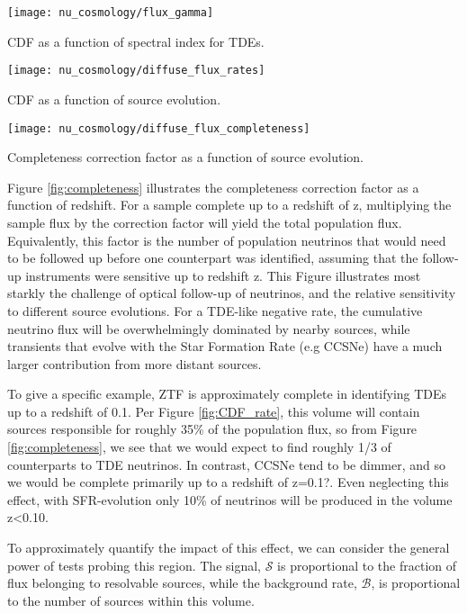 \begin{marginfigure}
	\centering \texttt{[image: nu\_cosmology/flux\_gamma]}
	\caption{CDF as a function of spectral index for TDEs.}
	\label{fig:CDF_gamma}
\end{marginfigure}


\begin{marginfigure}
	\centering \texttt{[image: nu\_cosmology/diffuse\_flux\_rates]}
	\caption{CDF as a function of source evolution.}
	\label{fig:CDF_rate}
\end{marginfigure}

\begin{marginfigure}
	\centering \texttt{[image: nu\_cosmology/diffuse\_flux\_completeness]}
	\caption{Completeness correction factor as a function of source evolution.}
	\label{fig:completeness}
\end{marginfigure}

Figure \ref{fig:completeness} illustrates the completeness correction factor as a function of redshift. For a sample complete up to a redshift of z, multiplying the sample flux by the correction factor will yield the total population flux. Equivalently,  this factor is the number of population neutrinos that would need to be followed up before one counterpart was identified, assuming that the follow-up instruments were sensitive up to redshift z. This Figure illustrates most starkly the challenge of optical follow-up of neutrinos, and the relative sensitivity to different source evolutions. For a TDE-like negative rate, the cumulative neutrino flux  will be overwhelmingly dominated by nearby sources, while transients that evolve with the Star Formation Rate (e.g CCSNe) have a much larger contribution from more distant sources.

To give a specific example, ZTF is approximately complete in identifying TDEs up to a redshift of 0.1. Per Figure \ref{fig:CDF_rate}, this volume will contain sources responsible for roughly 35\% of the population flux, so from Figure \ref{fig:completeness}, we see that we would expect to find roughly 1/3 of counterparts to TDE neutrinos. In contrast, CCSNe tend to be dimmer, and so we would be complete primarily up to a redshift of z=0.1?. Even neglecting this effect, with SFR-evolution only 10\% of neutrinos will be produced in the volume z<0.10.

To approximately quantify the impact of this effect, we can consider the general power of tests probing this region. The signal, $\mathcal{S}$ is proportional to the fraction of flux belonging to resolvable sources, while the background rate, $\mathcal{B}$, is proportional to the number of sources within this volume.

